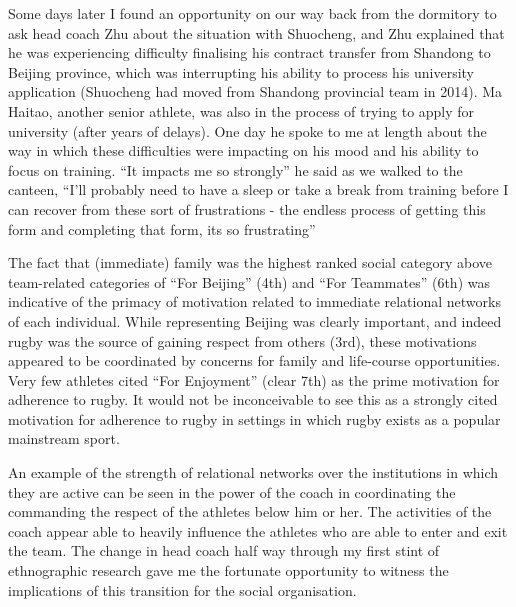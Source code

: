 \begin{CJK}{UTF8}{gbsn}
Some days later I found an opportunity on our way back from the dormitory to ask head coach Zhu about the situation with Shuocheng, and Zhu explained that he was experiencing difficulty finalising his contract transfer from Shandong to Beijing province, which was interrupting his ability to process his university application (Shuocheng had moved from Shandong provincial team in 2014).  Ma Haitao, another senior athlete, was also in the process of trying to apply for university (after years of delays).  One day he spoke to me at length about the way in which these difficulties were impacting on his mood and his ability to focus on training. ``It impacts me so strongly'' he said as we walked to the canteen, ``I’ll probably need to have a sleep or take a break from training before I can recover from these sort of frustrations - the endless process of getting this form and completing that form, its so frustrating''

The fact that (immediate) family was the highest ranked social category above team-related categories of ``For Beijing'' (4th) and ``For Teammates'' (6th) was indicative of the primacy of motivation related to immediate relational networks of each individual.  While representing Beijing was clearly important, and indeed rugby was the source of gaining respect from others (3rd), these motivations appeared to be coordinated by concerns for family and life-course opportunities.  Very few athletes cited ``For Enjoyment'' (clear 7th) as the prime motivation for adherence to rugby.  It would not be inconceivable to see this as a strongly cited motivation for adherence to rugby in settings in which rugby exists as a popular mainstream sport.

An example of the strength of relational networks over the institutions in which they are active can be seen in the power of the coach in coordinating the commanding the respect of the athletes below him or her.  The activities of the coach appear able to heavily influence the athletes who are able to enter and exit the team.  The change in head coach half way through my first stint of ethnographic research gave me the fortunate opportunity to witness the implications of this transition for the social organisation.


\end{CJK}
